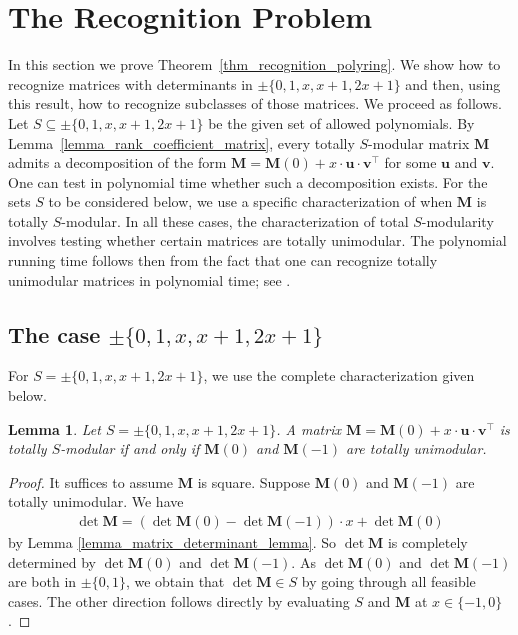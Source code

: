 \documentclass[a4paper, 11pt]{article}
\newcommand{\bv}{\bm{v}}
\newcommand{\bu}{\bm{u}}
\newcommand{\bM}{\bm{M}}
\newcommand{\indet}{x}
\newcommand{\polyS}{S}
\newcommand{\polyM}{\bM}
\newtheorem{lemma}{Lemma}
\begin{document}
	\section{The Recognition Problem}
	\label{sec_recognition}
	In this section we prove Theorem~\ref{thm_recognition_polyring}. We show how to recognize matrices with determinants in $\pm\lbrace 0,1,\indet,\indet + 1,2\indet + 1\rbrace$ and then, using this result, how to recognize subclasses of those matrices. We proceed as follows. Let $\polyS\subseteq \pm\lbrace 0,1,\indet,\indet + 1,2\indet + 1\rbrace$ be the given set of allowed polynomials. By Lemma~\ref{lemma_rank_coefficient_matrix}, every totally $\polyS$-modular matrix $\polyM$ admits a decomposition of the form $\polyM = \bM(0) + \indet\cdot\bm{u}\cdot\bm{v}^\top$ for some $\bu$ and $\bv$. One can test in polynomial time whether such a decomposition exists. For the sets $\polyS$ to be considered below, we use a specific characterization of when $\polyM$ is totally $\polyS$-modular. In all these cases, the characterization of total $\polyS$-modularity involves testing whether certain matrices are totally unimodular.	The polynomial running time follows then from the fact that one can recognize totally unimodular matrices in polynomial time; see \cite[Chapter 20]{schrijvertheorylinint86}.
	
	\subsection{The case $\pm \lbrace 0,1,\indet,\indet + 1,2\indet + 1\rbrace$} 
	For $S=\pm\lbrace 0,1,\indet,\indet+1,2\indet+1\rbrace$, 
	we use the complete characterization given below. 
	\begin{lemma}
		\label{lemma_t_bar_t_tu}
		Let $S=\pm\lbrace 0,1,\indet,\indet+1,2\indet+1\rbrace$. A matrix $\polyM = \bM(0) + \indet \cdot\bm{u}\cdot\bm{v}^\top$ is totally $\polyS$-modular if and only if $\bM(0)$ and $\bM(-1)$ are totally unimodular.
	\end{lemma}
	\begin{proof}
		It suffices to assume $\bM$ is square. Suppose $\bM(0)$ and $\bM(-1)$ are totally unimodular. We have
		\begin{align}\label{eq_proof_recognition_matrix_determinant_lemma}
			\det\polyM = \left(\det\bM(0) - \det\bM(-1)\right)\cdot \indet + \det\bM(0)
		\end{align}
		by Lemma \ref{lemma_matrix_determinant_lemma}. So $\det\polyM$ is completely determined by $\det\bM(0)$ and $\det\bM(-1)$. 
		As $\det\bM(0)$ and $\det\bM(-1)$ are both in $\pm\lbrace 0, 1\rbrace$, we obtain that $\det\polyM\in\polyS$ by going through all feasible cases. The other direction follows directly by evaluating $\polyS$ and $\polyM$ at $\indet\in\lbrace -1,0\rbrace$. 
	\end{proof}
	
\end{document}
